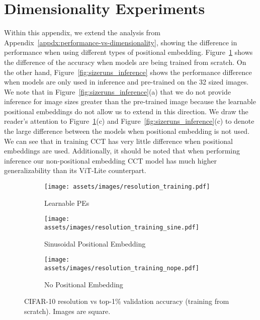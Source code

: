 \documentclass[10pt,twocolumn,letterpaper]{article}
\begin{document}
\section{Dimensionality Experiments}
\label{appdx:dimensionality}
Within this appendix, we extend the analysis from Appendix~\ref{appdx:performance-vs-dimensionality}, showing the difference in performance when using different types of positional embedding. Figure~\ref{fig:sizeruns_training} shows the difference of the accuracy when models are being trained from scratch. On the other hand, Figure~\ref{fig:sizeruns_inference} shows the performance difference when models are only used in inference and pre-trained on the 32 sized images. We note that in Figure~\ref{fig:sizeruns_inference}(a) that we do not provide inference for image sizes greater than the pre-trained image because the learnable positional embeddings do not allow us to extend in this direction.
We draw the reader's attention to Figure~\ref{fig:sizeruns_training}(c) and Figure~\ref{fig:sizeruns_inference}(c) to denote the large difference between the models when positional embedding is not used.
We can see that in training CCT has very little difference when positional embeddings are used.
Additionally, it should be noted that when performing inference our non-positional embedding CCT model has much higher generalizability than its ViT-Lite counterpart.


\begin{figure}[h!]
     \centering
     \begin{subfigure}[b]{0.42\textwidth}
         \centering
         \texttt{[image: assets/images/resolution\_training.pdf]}
         \caption{Learnable PEs}
     \end{subfigure}
     \hfill
     \begin{subfigure}[b]{0.42\textwidth}
         \centering
         \texttt{[image: assets/images/resolution\_training\_sine.pdf]}
         \caption{Sinusoidal Positional Embedding}
     \end{subfigure}
     \hfill
     \begin{subfigure}[b]{0.42\textwidth}
         \centering
         \texttt{[image: assets/images/resolution\_training\_nope.pdf]}
         \caption{No Positional Embedding}
     \end{subfigure}
    \caption{CIFAR-10 resolution vs top-1\% validation accuracy (training from scratch). Images are square.}
    \label{fig:sizeruns_training}
\end{figure}
\end{document}
